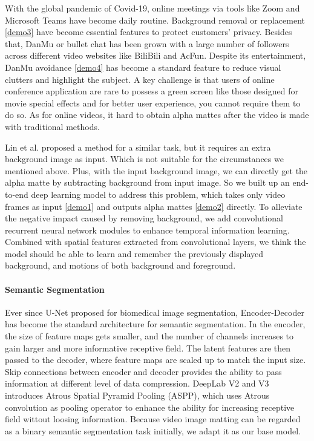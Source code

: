 \documentclass[final]{cvpr}
\begin{document}
With the global pandemic of Covid-19, online meetings via tools like Zoom and Microsoft Teams have become daily routine.
Background removal or replacement \ref{demo3} have become essential features to protect customers' privacy.
Besides that, DanMu or bullet chat has been grown with a large number of followers across different video websites like BiliBili and AcFun.
Despite its entertainment, DanMu avoidance \ref{demo4} has become a standard feature to reduce visual clutters and highlight the subject.
A key challenge is that users of online conference application are rare to possess a green screen like those designed for movie special effects and for better user experience, you cannot require them to do so. As for online videos, it hard to obtain alpha mattes after the video is made with traditional methods.

Lin et al. \cite{linRealTimeHighResolutionBackground2020a} proposed a method for a similar task, but it requires an extra background image as input.
Which is not suitable for the circumstances we mentioned above.
Plus, with the input background image, we can directly get the alpha matte by subtracting background from input image.
So we built up an end-to-end deep learning model to address this problem, which takes only video frames as input \ref{demo1} and outputs alpha mattes \ref{demo2} directly.
To alleviate the negative impact caused by removing background, we add convolutional recurrent neural network modules to enhance temporal information learning.
Combined with spatial features extracted from convolutional layers, we think the model should be able to learn and remember the previously displayed background, and motions of both background and foreground.

\paragraph{Semantic Segmentation}

Ever since U-Net \cite{Ronneberger2015UNetCN} proposed for biomedical image segmentation, Encoder-Decoder has become the standard architecture for semantic segmentation.
In the encoder, the size of feature maps gets smaller, and the number of channels increases to gain larger and more informative receptive field.
The latent features are then passed to the decoder, where feature maps are scaled up to match the input size.
Skip connections between encoder and decoder provides the ability to pass information at different level of data compression.
DeepLab V2 \cite{Chen2018DeepLabSI} and V3 \cite{chenRethinkingAtrousConvolution2017} introduces Atrous Spatial Pyramid Pooling (ASPP), which uses Atrous convolution as pooling operator to enhance the ability for increasing receptive field wittout loosing information.
Because video image matting can be regarded as a binary semantic segmentation task initially, we adapt it as our base model.
\end{document}
